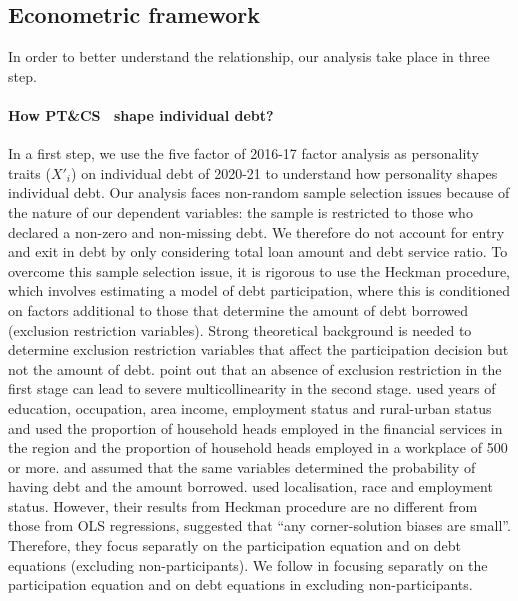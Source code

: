 \documentclass[a4paper, 11pt, onecolumn]{article}
\newcommand{\PTCS}{PT\&CS}
\begin{document}
	\subsection{Econometric framework}
	\label{subsection:econometricframework}

In order to better understand the relationship, our analysis take place in three step.
\paragraph{How \PTCS~ shape individual debt?}
In a first step, we use the five factor of 2016-17 factor analysis as personality traits ($X'_{i}$) on individual debt of 2020-21 to understand how personality shapes individual debt.
Our analysis faces non-random sample selection issues because of the nature of our dependent variables: the sample is restricted to those who declared a non-zero and non-missing debt.
We therefore do not account for entry and exit in debt by only considering total loan amount and debt service ratio.
To overcome this sample selection issue, it is rigorous to use the Heckman procedure, which involves estimating a model of debt participation, where this is conditioned on factors additional to those that determine the amount of debt borrowed (exclusion restriction variables).
Strong theoretical background is needed to determine exclusion restriction variables that affect the participation decision but not the amount of debt.
\cite{Lennox2011} point out that an absence of exclusion restriction in the first stage can lead to severe multicollinearity in the second stage.
\cite{Cox1993} used years of education, occupation, area income, employment status and rural-urban status and \cite{Bertaut2002} used the proportion of household heads employed in the financial services in the region and the proportion of household heads employed in a workplace of 500 or more.
\cite{Duca1993} and \cite{Crook2001} assumed that the same variables determined the probability of having debt and the amount borrowed.
\cite{Rio2006} used localisation, race and employment status.
However, their results from Heckman procedure are no different from those from OLS regressions, suggested that ``any corner-solution biases are small''.
Therefore, they focus separatly on the participation equation and on debt equations (excluding non-participants).
We follow \cite{Rio2006} in focusing separatly on the participation equation and on debt equations in excluding non-participants.
\end{document}
